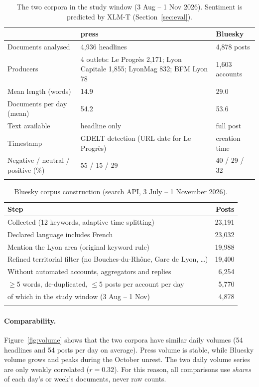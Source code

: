 \documentclass[pdflatex,sn-mathphys-num]{sn-jnl}
\newcommand{\press}{\textcolor{press}{\textsf{press}}}
\newcommand{\bsky}{\textcolor{bsky}{\textsf{Bluesky}}}
\begin{document}
\begin{table}[htbp]
\caption{The two corpora in the study window (3 Aug -- 1 Nov 2026). Sentiment is predicted by XLM-T (Section~\ref{sec:eval}).}\label{tab:data}
\begin{tabularx}{\textwidth}{@{}lXX@{}}
\toprule
 & \press & \bsky \\
\midrule
Documents analysed & 4,936 headlines & 4,878 posts \\
Producers & 4 outlets: Le Progr\`es 2,171; Lyon Capitale 1,855; LyonMag 832; BFM Lyon 78 & 1,603 accounts \\
Mean length (words) & 14.9 & 29.0 \\
Documents per day (mean) & 54.2 & 53.6 \\
Text available & headline only & full post \\
Timestamp & GDELT detection (URL date for Le Progr\`es) & creation time \\
Negative / neutral / positive (\%) & 55 / 15 / 29 & 40 / 29 / 32 \\
\botrule
\end{tabularx}
\end{table}

\begin{table}[htbp]
\caption{Bluesky corpus construction (search API, 3 July -- 1 November 2026).}\label{tab:funnel}
\begin{tabular*}{\textwidth}{@{\extracolsep\fill}lr}
\toprule
Step & Posts \\
\midrule
Collected (12 keywords, adaptive time splitting) & 23,191 \\
Declared language includes French & 23,032 \\
Mention the Lyon area (original keyword rule) & 19,988 \\
Refined territorial filter (no Bouches-du-Rh\^one, Gare de Lyon, \dots) & 19,400 \\
Without automated accounts, aggregators and replies & 6,254 \\
$\ge$5 words, de-duplicated, $\le$5 posts per account per day & 5,770 \\
\quad of which in the study window (3 Aug -- 1 Nov) & 4,878 \\
\botrule
\end{tabular*}
\end{table}

\paragraph{Comparability.} Figure~\ref{fig:volume} shows that the two corpora have similar daily volumes (54 headlines and 54 posts per day on average). Press volume is stable, while Bluesky volume grows and peaks during the October unrest. The two daily volume series are only weakly correlated ($r=0.32$). For this reason, all comparisons use \emph{shares} of each day's or week's documents, never raw counts.
\end{document}
